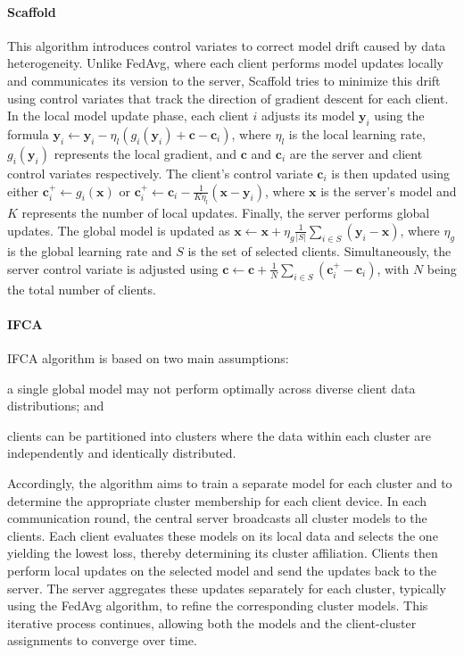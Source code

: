 \paragraph{Scaffold}
This algorithm introduces control variates to correct model drift caused by data heterogeneity. 
%
Unlike FedAvg, where each client performs model updates locally and communicates its version to the server, 
 Scaffold tries to minimize this drift using control variates that track the direction of gradient descent for each client.
%
In the local model update phase, each client $i$ adjusts its model $\mathbf{y}_i$ using the formula 
 $\mathbf{y}_i \leftarrow \mathbf{y}_i - \eta_l (g_i(\mathbf{y}_i) + \mathbf{c} - \mathbf{c}_i)$, where $\eta_l$ is the 
 local learning rate, $g_i(\mathbf{y}_i)$ represents the local gradient, and $\mathbf{c}$ and $\mathbf{c}_i$ are the server 
 and client control variates respectively.
%
The client's control variate $\mathbf{c}_i$ is then updated using either $\mathbf{c}^+_i \leftarrow g_i(\mathbf{x})$ or 
 $\mathbf{c}^+_i \leftarrow \mathbf{c}_i - \frac{1}{K\eta_l}(\mathbf{x} - \mathbf{y}_i)$, where $\mathbf{x}$ is the server's model 
 and $K$ represents the number of local updates.
%
Finally, the server performs global updates. 
%
The global model is updated as $\mathbf{x} \leftarrow \mathbf{x} + \eta_g \frac{1}{|S|} \sum_{i \in S} (\mathbf{y}_i - \mathbf{x})$, 
 where $\eta_g$ is the global learning rate and $S$ is the set of selected clients. 
% 
Simultaneously, the server control variate is adjusted using 
 $\mathbf{c} \leftarrow \mathbf{c} + \frac{1}{N} \sum_{i \in S} (\mathbf{c}^+_i - \mathbf{c}_i)$, 
 with $N$ being the total number of clients.

\paragraph{IFCA}

IFCA algorithm is based on two main assumptions:
\begin{enumerate*}[label=(\roman*)]
    \item a single global model may not perform optimally across diverse client data distributions; and
    \item clients can be partitioned into clusters where the data within each cluster are independently and identically distributed.
\end{enumerate*}
%
Accordingly, the algorithm aims to train a separate model for each cluster and to determine the appropriate 
 cluster membership for each client device.
%
In each communication round, the central server broadcasts all cluster models to the clients. 
%
Each client evaluates these models on its local data and selects the one yielding the lowest loss, 
 thereby determining its cluster affiliation. 
%
Clients then perform local updates on the selected model and send the updates back to the server. 
%
The server aggregates these updates separately for each cluster, typically using the FedAvg algorithm, 
 to refine the corresponding cluster models.
% 
This iterative process continues, allowing both the models and the client-cluster assignments 
 to converge over time.

